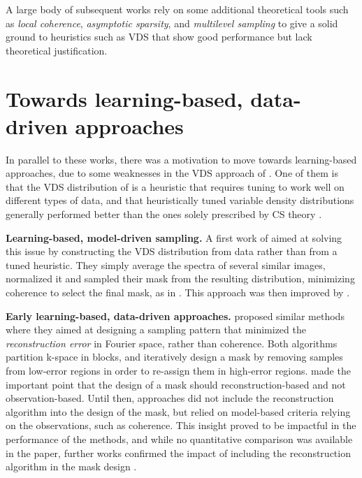 A large body of subsequent works \citep{krahmer2013stable,roman2014asymptotic,adcock2015quest,adcock2017breaking} rely on some additional theoretical tools such as \textit{local coherence}, \textit{asymptotic sparsity}, and \textit{multilevel sampling} to give a solid ground to heuristics such as VDS that show good performance but lack theoretical justification. 


\section{Towards learning-based, data-driven approaches}
In parallel to these works, there was a motivation to move towards learning-based approaches, due to some weaknesses in the VDS approach of \citet{lustig2007sparse}. One of them is that the VDS distribution of  is a heuristic that requires tuning to work well on different types of data, and that heuristically tuned variable density distributions generally performed better than the ones solely prescribed by CS theory \citep{chauffert2013variable}. 

\textbf{Learning-based, model-driven sampling.} A first work of \citet{knoll2011adapted} aimed at solving this issue by constructing the VDS distribution from data rather than from a tuned heuristic. They simply average the spectra of several similar images, normalized it and sampled their mask from the resulting distribution, minimizing coherence to select the final mask, as in \citet{lustig2007sparse}. This approach was then improved by \citet{zhang2014energy,vellagoundar2015robust}.


\textbf{Early learning-based, data-driven approaches.} \citet{ravishankar2011adaptive,liu2012under} proposed similar methods where they aimed at designing a sampling pattern that minimized the \textit{reconstruction error} in Fourier space, rather than coherence. Both algorithms partition k-space in blocks, and iteratively design a mask by removing samples from low-error regions in order to re-assign them in high-error regions. \citet{liu2012under} made the important point that the design of a mask should reconstruction-based and not observation-based. Until then, approaches did not include the reconstruction algorithm into the design of the mask, but relied on model-based criteria relying on the observations, such as coherence. This insight proved to be impactful in the performance of the methods, and while no quantitative comparison was available in the paper, further works confirmed the impact of including the reconstruction algorithm in the mask design \citep{zijlstra2016evaluation}.

